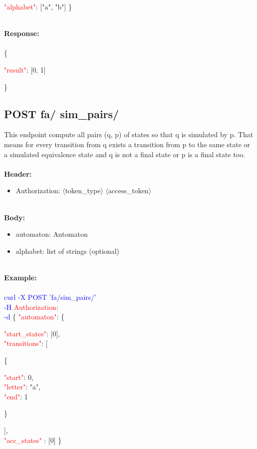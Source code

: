    \begin{adjustwidth}{7.5 mm}{0 cm}
    \textcolor{red}{"alphabet"}: ["a", "b"] \}
    \end{adjustwidth}
\ \\
\textbf{Response:}\\
\ \\
\{
\begin{adjustwidth}{7.5 mm}{0 cm}
    \textcolor{red}{"result"}: [0, 1]
\end{adjustwidth}
\}









\subsection{POST fa/ sim\_pairs/}
This endpoint compute all pairs (q, p) of states so that q is simulated by p. That means for every transition from q exists a transition from p to the same state or a simulated equivalence state and q is not a final state or p is a final state too.  \\
\ \\
\textbf{Header:}
\begin{itemize}
    \item Authorization: $\langle$token\_type$\rangle$ $\langle$access\_token$\rangle$
\end{itemize}
\ \\
\textbf{Body:}
\begin{itemize}
    \item automaton: Automaton
    \item alphabet: list of strings (optional)
\end{itemize}
\ \\
\textbf{Example:} \\
\ \\
\textcolor{blue}{curl -X POST '\BaseURL fa/sim\_pairs/'\\
-H} \textcolor{red}{Authorization}: \Auth \\
\textcolor{blue}{-d} \{ 
     \textcolor{red}{"automaton"}: \{
     \begin{adjustwidth}{7.5 mm}{0 cm}
     \begin{adjustwidth}{7.5 mm}{0 cm}
            \textcolor{red}{"start\_states"}: [0],\\
            \textcolor{red}{"transitions"}: [
            \begin{adjustwidth}{7.5 mm}{0 cm}
            \{
               \begin{adjustwidth}{7.5 mm}{0 cm}
                    \textcolor{red}{"start"}: 0,\\
                    \textcolor{red}{"letter"}: "a",\\
                    \textcolor{red}{"end"}: 1
               \end{adjustwidth}
            \}
            \end{adjustwidth}
            ],\\
        \textcolor{red}{"acc\_states" }: [0]  \}
    \end{adjustwidth}
    \end{adjustwidth}
